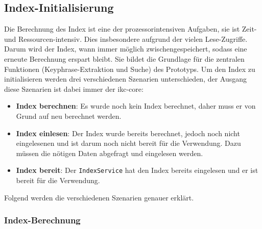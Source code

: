 
    
\subsection{Index-Initialisierung}


Die Berechnung des Index ist eine der prozessorintensiven Aufgaben, sie ist Zeit- und Ressourcen-intensiv. Dies insbesondere aufgrund der vielen Lese-Zugriffe. Darum wird der Index, wann immer möglich zwischengespeichert, sodass eine erneute Berechnung erspart bleibt. Sie bildet die Grundlage für die zentralen Funktionen (\gls{Keyphrase}-Ex\-trak\-tion und Suche) des Prototyps. Um den Index zu initialisieren werden drei verschiedenen Szenarien unterschieden, der Ausgang diese Szenarien ist dabei immer der \gls{ikc-core}:
\begin{itemize}
    \item \textbf{Index berechnen}: Es wurde noch kein Index berechnet, daher muss er von Grund auf neu berechnet werden.
    \item \textbf{Index einlesen}: Der Index wurde bereits berechnet, jedoch noch nicht eingelesenen und ist darum noch nicht bereit für die Verwendung. Dazu müssen die nötigen Daten abgefragt und eingelesen werden.
    \item \textbf{Index bereit}: Der \texttt{IndexService} hat den Index bereits eingelesen und er ist bereit für die Verwendung.
\end{itemize}

Folgend werden die verschiedenen Szenarien genauer erklärt.


\subsubsection{Index-Berechnung}


